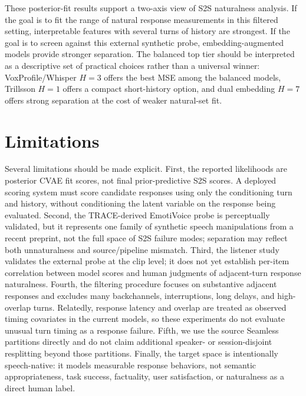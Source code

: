 \documentclass[conference]{IEEEtran}
\begin{document}
These posterior-fit results support a two-axis view of S2S naturalness analysis.
If the goal is to fit the range of natural response measurements in this filtered setting, interpretable features with several turns of history are strongest.
If the goal is to screen against this external synthetic probe, embedding-augmented models provide stronger separation.
The balanced top tier should be interpreted as a descriptive set of practical choices rather than a universal winner: VoxProfile/Whisper $H=3$ offers the best MSE among the balanced models, Trillsson $H=1$ offers a compact short-history option, and dual embedding $H=7$ offers strong separation at the cost of weaker natural-set fit.

\section{Limitations}
Several limitations should be made explicit.
First, the reported likelihoods are posterior CVAE fit scores, not final prior-predictive S2S scores.
A deployed scoring system must score candidate responses using only the conditioning turn and history, without conditioning the latent variable on the response being evaluated.
Second, the TRACE-derived EmotiVoice probe is perceptually validated, but it represents one family of synthetic speech manipulations from a recent preprint, not the full space of S2S failure modes; separation may reflect both unnaturalness and source/pipeline mismatch.
Third, the listener study validates the external probe at the clip level; it does not yet establish per-item correlation between model scores and human judgments of adjacent-turn response naturalness.
Fourth, the filtering procedure focuses on substantive adjacent responses and excludes many backchannels, interruptions, long delays, and high-overlap turns.
Relatedly, response latency and overlap are treated as observed timing covariates in the current models, so these experiments do not evaluate unusual turn timing as a response failure.
Fifth, we use the source Seamless partitions directly and do not claim additional speaker- or session-disjoint resplitting beyond those partitions.
Finally, the target space is intentionally speech-native: it models measurable response behaviors, not semantic appropriateness, task success, factuality, user satisfaction, or naturalness as a direct human label.
\end{document}
